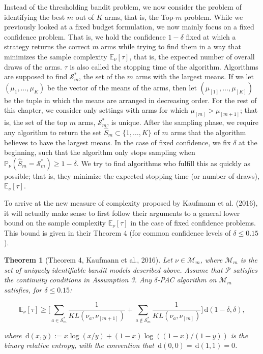 \documentclass[12pt,]{article}
\newtheorem{theorem}{Theorem}
\newcommand{\der}{\,\text{d}}
\begin{document}
Instead of the thresholding bandit problem, we now consider the problem
of identifying the best \(m\) out of \(K\) arms, that is, the Top-\(m\)
problem. While we previously looked at a fixed budget formulation, we
now mainly focus on a fixed confidence problem. That is, we hold the
confidence \(1-\delta\) fixed at which a strategy returns the correct
\(m\) arms while trying to find them in a way that minimizes the sample
complexity \(\mathbb{E}_{\nu}[\tau]\), that is, the expected number of
overall draws of the arms. \(\tau\) is also called the stopping time of
the algorithm. Algorithms are supposed to find \(\mathcal{S}_m^*\), the
set of the \(m\) arms with the largest means. If we let
\((\mu_1, \dots, \mu_K)\) be the vector of the means of the arms, then
let \((\mu_{[1]}, \dots, \mu_{[K]})\) be the tuple in which the means
are arranged in decreasing order. For the rest of this chapter, we
consider only settings with arms for which \(\mu_{[m]} > \mu_{[m+1]}\);
that is, the set of the top \(m\) arms, \(\mathcal{S}_m^*\), is unique.
After the sampling phase, we require any algorithm to return the set
\(\hat{S}_m \subset \{1,\dots,K\}\) of \(m\) arms that the algorithm
believes to have the largest means. In the case of fixed confidence, we
fix \(\delta\) at the beginning, such that the algorithm only stops
sampling when
\(\mathbb{P}_{\nu}(\hat{S}_m = \mathcal{S}_m^*) \geq 1-\delta\). We try
to find algorithms who fulfill this as quickly as possible; that is,
they minimize the expected stopping time (or number of draws),
\(\mathbb{E}_{\nu}[\tau]\).

To arrive at the new measure of complexity proposed by Kaufmann et al.
(2016), it will actually make sense to first follow their arguments to a
general lower bound on the sample complexity \(\mathbb{E}_{\nu}[\tau]\)
in the case of fixed confidence problems. This bound is given in their
Theorem 4 (for common confidence levels of \(\delta \leq 0.15\)).

\begin{theorem}[Theorem 4, Kaufmann et al., 2016] \label{theorem:KaufmannEtAlTheorem4}
Let $\nu \in \mathcal{M}_m$, where $\mathcal{M}_m$ is the set of uniquely identifiable bandit models described above. Assume that $\mathcal{P}$ satisfies the continuity conditions in Assumption 3. Any $\delta$-PAC algorithm on $\mathcal{M}_m$ satisfies, for $\delta \leq 0.15$:

\begin{equation*}
\mathbb{E}_{\nu}[\tau] \geq \Big[ \sum_{a \in \mathcal{S}^*_m} \frac{1}{KL(\nu_a, \nu_{[m+1]})} + \sum_{a \notin \mathcal{S}^*_m} \frac{1}{KL(\nu_a, \nu_{[m]})} \Big] \der(1-\delta, \delta),
\end{equation*}

where $\der(x,y) := x \log(x/y) + (1-x) \log((1-x)/(1-y))$ is the binary relative entropy, with the convention that $\der(0,0) = \der(1,1) = 0$.
\end{theorem}
\end{document}
